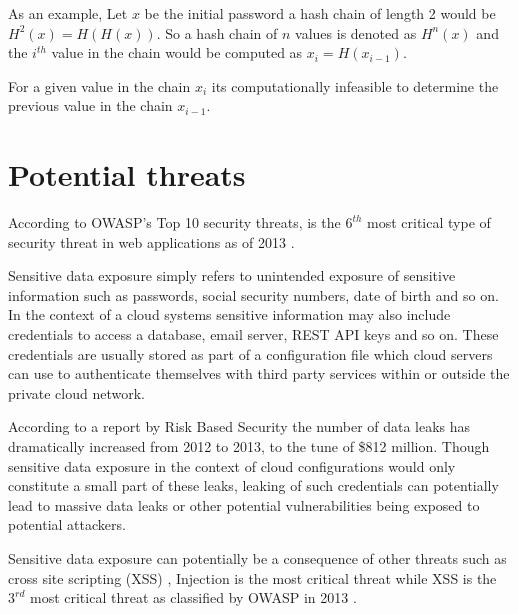 \documentclass[12pt,conference]{IEEEtran}
\begin{document}

As an example, Let $x$ be the initial password a hash chain of length 2 would be $H^{2}(x) = H(H(x))$. So a hash chain of $n$ values is denoted as $H^{n}(x)$ and the $i^{th}$ value in the chain would be computed as $x_{i} = H(x_{i-1})$.

For a given value in the chain $x_{i}$ its computationally infeasible to determine the previous value in the chain $x_{i-1}$.

\section*{Potential threats}

According to OWASP's Top 10 security threats,  is the $6^{th}$ most critical type of security threat in web applications as of 2013 \cite{wichers_owasp_2014}. 

Sensitive data exposure simply refers to unintended exposure of sensitive information such as passwords, social security numbers, date of birth and so on. In the context of a cloud systems sensitive information may also include credentials to access a database, email server, REST API keys and so on. These credentials are usually stored as part of a configuration file which cloud servers can use to authenticate themselves with third party services within or outside the private cloud network. 

According to a report by Risk Based Security \cite{risk_based_executives_2014} \cite{shu_privacy-preserving_2015} the number of data leaks has dramatically increased from 2012 to 2013, to the tune of \$812 million. Though sensitive data exposure in the context of cloud configurations would only constitute a small part of these leaks, leaking of such credentials can potentially lead to massive data leaks or other potential vulnerabilities being exposed to potential attackers.

Sensitive data exposure can potentially be a consequence of other threats such as cross site scripting (XSS) \cite{louw_blueprint:_2009}, Injection is the most critical threat while XSS is the $3^{rd}$ most critical threat as classified by OWASP in 2013 \cite{wichers_owasp_2014}. 
\end{document}
